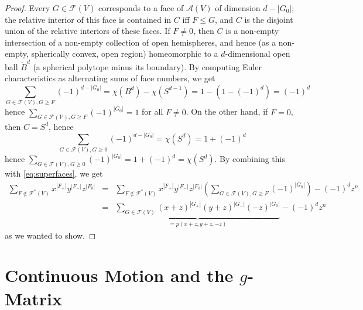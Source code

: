 \documentclass[11pt]{article}
\newcommand{\arr}{\mathcal{A}}
\renewcommand{\leq}{\leqslant}
\renewcommand{\geq}{\geqslant}
\begin{document}
\begin{proof}
Every $G\in \mathcal{F}(V)$ corresponds to a face of $\arr(V)$ of dimension $d-|G_0|$; the relative interior of this face is contained in $C$ iff $F\leq G$, and $C$ is the disjoint union of the relative interiors of these faces. 
%
If $F\neq 0$, then $C$ is a non-empty intersection of a non-empty collection of open hemispheres, and hence (as a non-empty, spherically convex, open region) homeomorphic to a $d$-dimensional open ball $\mathring{B}^d$ (a spherical polytope minus its boundary). By computing Euler characteristics as alternating sums of face numbers, we get
\[
\sum_{G\in \mathcal{F}(V), G\geq F} (-1)^{d-|G_0|}=\chi(B^d)-\chi(S^{d-1})=1-(1-(-1)^d)=(-1)^d
\]
hence $\sum_{G\in \mathcal{F(V)}, G\geq F}(-1)^{|G_0|}=1$ for all $F\neq 0$. 
%
On the other hand, if $F = 0$, then $C=S^d$, hence
\[
\sum_{G\in \mathcal{F}(V), G\geq 0} (-1)^{d-|G_0|}=\chi(S^d)=1+(-1)^d
\]
hence $\sum_{G\in \mathcal{F}(V), G\geq 0}(-1)^{|G_0|}=1+(-1)^d=\chi(S^d)$.
By combining this with \eqref{eq:superfaces}, we get
\begin{eqnarray*}
\sum_{F \not\in \mathcal{F}^*(V)} x^{|F_+|} y^{|F_-|} z^{|F_0|} &= & \sum_{F \not\in \mathcal{F}^*(V)} x^{|F_+|} y^{|F_-|} z^{|F_0|}\left( \sum_{G\in \mathcal{F}(V), G\geq F} (-1)^{|G_0|} \right)-(-1)^d z^n \\
&= & \underbrace{\sum_{G\in \mathcal{F}(V)} (x+z)^{|G_+|} (y+z)^{|G_-|} (-z)^{|G_0|}}_{=p(x+z,y+z,-z)}-(-1)^d z^n
\end{eqnarray*}
as we wanted to show.
\end{proof}
%
\section{Continuous Motion and the $g$-Matrix}
\label{sec:g-matrix}
%
\end{document}
